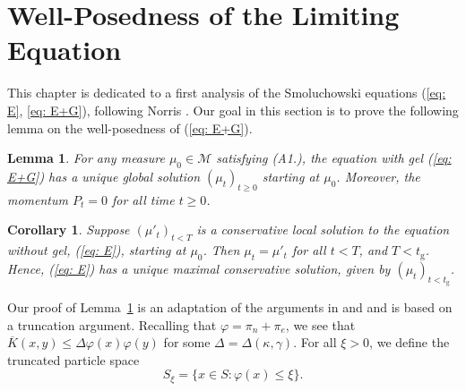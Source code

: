 \documentclass[11pt, notitlepage]{article}
\newtheorem{lem}[thm]{Lemma}
\newtheorem{cor}[thm]{Corollary}
\begin{document}
\section{\textbf{Well-Posedness of the Limiting Equation}}\label{sec:SE}  This chapter is dedicated to a first analysis of the Smoluchowski equations (\ref{eq: E}, \ref{eq: E+G}), following Norris \cite{N99,N00}. Our goal in this section is to prove the following lemma on the well-posedness of (\ref{eq: E+G}).

\begin{lem}\label{lemma: E and U} For any measure $\mu_0 \in \mathcal{M}$ satisfying (A1.), the equation with gel (\ref{eq: E+G}) has a unique global solution $(\mu_t)_{t\geq 0}$ starting at $\mu_0$. Moreover, the momentum $P_t=0$ for all time $t\ge 0$. \end{lem}
\begin{cor}\label{cor: maximal conservative solutions} Suppose $(\mu'_t)_{t<T}$ is a conservative local solution to the equation without gel, (\ref{eq: E}), starting at $\mu_0$. Then $\mu_t=\mu'_t$ for all $t<T$, and $T<t_\mathrm{g}$. Hence, (\ref{eq: E}) has a unique maximal conservative solution, given by $(\mu_t)_{t<t_\mathrm{g}}$.
\end{cor}

Our proof of Lemma~\ref{lemma: E and U} is an adaptation of the arguments in \cite[Section 2]{N99} and \cite[Section 2]{N00} and is based on a truncation argument. Recalling that $\varphi=\pi_n+\pi_e$, we see that  $\overline{K}(x,y)\leq \Delta\varphi(x)\varphi(y)$ for some $\Delta=\Delta(\kappa, \gamma).$ For all $\xi>0$, we define the truncated particle space \begin{equation} \label{d:trunc_space} S_\xi=\{x\in S: \varphi(x) \le \xi\}. \end{equation}
\end{document}

